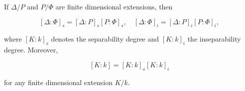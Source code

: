 If $\Delta/P$ and $P/\Phi$ are finite dimensional extensions, then

$$[\Delta:\Phi]_s = [\Delta:P]_s [P:\Phi]_s, \quad [\Delta:\Phi]_i = [\Delta:P]_i [P:\Phi]_i,$$

where $[K:k]_s$ denotes the separability degree and $[K:k]_i$ the inseparability degree. Moreover,

$$[K:k] = [K:k]_s [K:k]_i$$

for any finite dimensional extension $K/k$.
